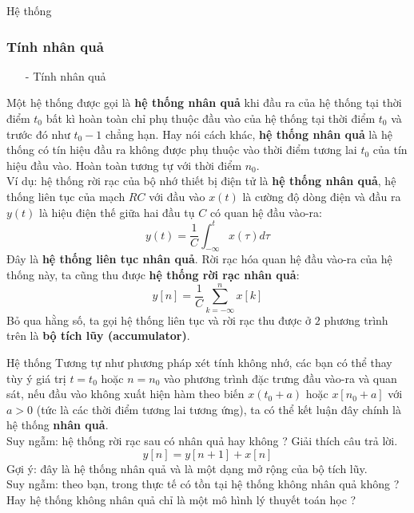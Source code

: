 \documentclass[8pt]{beamer}
\begin{document}
\begin{frame}{Hệ thống}
\subsubsection{Tính nhân quả}
\begin{itemize}
	\item[-] Tính nhân quả
\end{itemize}
Một hệ thống được gọi là \textbf{hệ thống nhân quả} khi đầu ra của hệ thống tại thời điểm $t_{0}$ bất kì hoàn toàn chỉ phụ thuộc đầu vào của hệ thống tại thời điểm $t_{0}$ và trước đó như $t_{0}-1$ chẳng hạn. Hay nói cách khác, \textbf{hệ thống nhân quả} là hệ thống có tín hiệu đầu ra \alert{không được phụ thuộc vào thời điểm tương lai $t_{0}$ của tín hiệu đầu vào}. Hoàn toàn tương tự với thời điểm $n_{0}$.
\\ Ví dụ: hệ thống rời rạc của bộ nhớ thiết bị điện tử là \textbf{hệ thống nhân quả}, hệ thống liên tục của mạch $RC$ với đầu vào $x(t)$ là cường độ dòng điện và đầu ra $y(t)$ là hiệu điện thế giữa hai đầu tụ $C$ có quan hệ đầu vào-ra:
$$y(t)=\frac{1}{C}\int_{-\infty}^{t}x(\tau)d\tau$$
Đây là \textbf{hệ thống liên tục nhân quả}.
Rời rạc hóa quan hệ đầu vào-ra của hệ thống này, ta cũng thu được \textbf{hệ thống rời rạc nhân quả}:
$$y[n]=\frac{1}{C}\sum_{k=-\infty}^{n}x[k]$$
Bỏ qua hằng số, ta gọi hệ thống liên tục và rời rạc thu được ở $2$ phương trình trên là \textbf{bộ tích lũy (accumulator)}.
\end{frame}
\begin{frame}{Hệ thống}
Tương tự như phương pháp xét tính không nhớ, các bạn có thể thay tùy ý giá trị $t=t_{0}$ hoặc $n=n_{0}$ vào phương trình đặc trưng đầu vào-ra và quan sát, nếu đầu vào \alert{không} xuất hiện hàm theo biến $x(t_{0}+a)$ hoặc $x[n_{0}+a]$ với $a>0$ (tức là các thời điểm tương lai tương ứng), ta có thể kết luận đây chính là hệ thống \textbf{nhân quả}.
\\ Suy ngẫm: hệ thống rời rạc sau có nhân quả hay không ? Giải thích câu trả lời.
$$y[n]=y[n+1]+x[n]$$
Gợi ý: đây là hệ thống nhân quả và là một dạng mở rộng của bộ tích lũy.
\\ Suy ngẫm: theo bạn, trong thực tế có tồn tại hệ thống không nhân quả không ? Hay hệ thống không nhân quả chỉ là một mô hình lý thuyết toán học ?
\end{frame}
\end{document}
